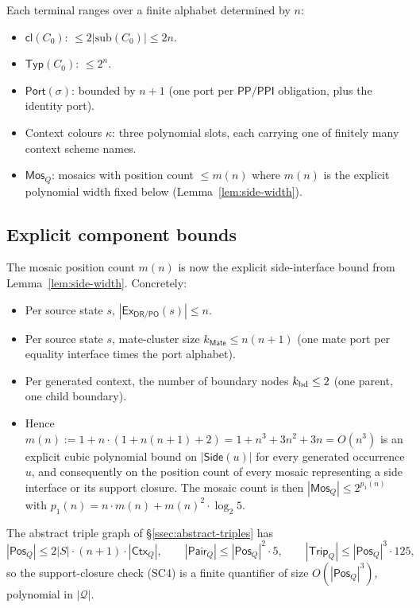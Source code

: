 \documentclass[11pt]{article}
\newcommand{\DR}{\mathsf{DR}}
\newcommand{\PO}{\mathsf{PO}}
\newcommand{\PP}{\mathsf{PP}}
\newcommand{\PPI}{\mathsf{PPI}}
\newcommand{\Cl}{\mathsf{cl}}
\newcommand{\Typ}{\mathsf{Typ}}
\newcommand{\Ex}{\mathsf{Ex}}
\newcommand{\Q}{\mathcal Q}
\newcommand{\Mos}{\mathsf{Mos}}
\newcommand{\Ctx}{\mathsf{Ctx}}
\newcommand{\Port}{\mathsf{Port}}
\newcommand{\Mate}{\mathsf{Mate}}
\newcommand{\Pos}{\mathsf{Pos}}
\newcommand{\Pair}{\mathsf{Pair}}
\newcommand{\Trip}{\mathsf{Trip}}
\newcommand{\Side}{\mathsf{Side}}
\begin{document}
Each terminal ranges over a finite alphabet determined by $n$:
\begin{itemize}[leftmargin=2em]
  \item $\Cl(C_0)$: $\le 2|\mathrm{sub}(C_0)| \le 2n$.
  \item $\Typ(C_0)$: $\le 2^n$.
  \item $\Port(\sigma)$: bounded by $n+1$ (one port per $\PP/\PPI$
    obligation, plus the identity port).
  \item Context colours $\kappa$: three polynomial slots, each
    carrying one of finitely many context scheme names.
  \item $\Mos_Q$: mosaics with position count $\le m(n)$ where
    $m(n)$ is the explicit polynomial width fixed below
    (Lemma~\ref{lem:side-width}).
\end{itemize}

\subsection{Explicit component bounds}
\label{ssec:bounds}

The mosaic position count $m(n)$ is now the explicit
side-interface bound from Lemma~\ref{lem:side-width}.  Concretely:
\begin{itemize}[leftmargin=2em]
\item Per source state $s$, $|\Ex_{\DR/\PO}(s)|\le n$.
\item Per source state $s$, mate-cluster size
$k_{\Mate}\le n(n+1)$ (one mate port per equality interface times
the port alphabet).
\item Per generated context, the number of boundary nodes
$k_{\rm bd}\le 2$ (one parent, one child boundary).
\item Hence $m(n):=1+n\cdot(1+n(n+1)+2)=1+n^3+3n^2+3n=O(n^3)$ is
an explicit cubic polynomial bound on $|\Side(u)|$ for every
generated occurrence $u$, and consequently on the position count
of every mosaic representing a side interface or its support
closure.  The mosaic count is then $|\Mos_Q|\le 2^{p_1(n)}$ with
$p_1(n)=n\cdot m(n)+m(n)^2\cdot\log_2 5$.
\end{itemize}
The abstract triple graph of \S\ref{ssec:abstract-triples} has
\[
  |\Pos_Q|\le 2|S|\cdot(n+1)\cdot|\Ctx_Q|,
  \qquad
  |\Pair_Q|\le|\Pos_Q|^2\cdot 5,
  \qquad
  |\Trip_Q|\le|\Pos_Q|^3\cdot 125,
\]
so the support-closure check (SC4) is a finite quantifier of size
$O(|\Pos_Q|^3)$, polynomial in $|\Q|$.
\end{document}
